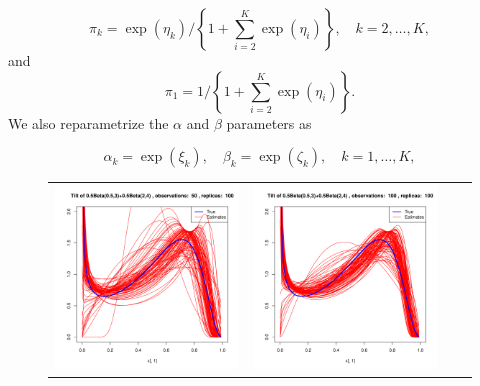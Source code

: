 \documentclass[10pt]{report}
\begin{document}
$$
\pi_k = \exp(\eta_k)/\left\{ 1+ \sum_{i=2}^K\exp(\eta_i)\right\}, \quad k=2,\ldots, K, 
$$
and 
$$
\pi_1 = 1/\left\{ 1+ \sum_{i=2}^K\exp(\eta_i)\right\}.
$$
We also reparametrize the $\alpha$ and $\beta$ parameters as

$$
\alpha_k = \exp(\xi_k), \quad \beta_k = \exp(\zeta_k), \quad k=1,\ldots,K,
$$

\begin{figure}[h]
\begin{tabular}{cccc}

	\includegraphics[width=\textwidth/4]{../img/p05_a05_b3_p05_a2_b4/tilted/K1/densities/n50_R100.pdf}
	&
	\includegraphics[width=\textwidth/4]{../img/p05_a05_b3_p05_a2_b4/tilted/K1/densities/n100_R100.pdf}

\end{tabular}
\end{figure}
\end{document}
